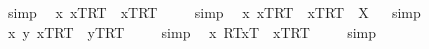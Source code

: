 \begin{isabellebody}
\isamarkupfalse%
\ simp\ \isamarkupfalse%
%
\endisatagproof
{\isafoldproof}%
%
\isadelimproof
%
\endisadelimproof
\isanewline
\isanewline
{}\isamarkupfalse%
\ {\isachardoublequoteopen}{\isacharbrackleft}{\isacharparenleft}\isactrlbold {\isasymforall}x{\isachardot}\ {\isasymlbrace}x\isactrlsup T{\isacharcomma}R\isactrlsup T{\isasymrbrace}\ \isactrlbold {\isasymrightarrow}\ {\isasymlbrace}x\isactrlsup T{\isacharcomma}R\isactrlsup T{\isasymrbrace}{\isacharparenright}{\isacharbrackright}\ {\isacharequal}\ {\isasymtop}{\isachardoublequoteclose}%
\isadelimproof
\ %
\endisadelimproof
%
\isatagproof
{}\isamarkupfalse%
\ simp\ \isamarkupfalse%
%
\endisatagproof
{\isafoldproof}%
%
\isadelimproof
%
\endisadelimproof
\isanewline
{}\isamarkupfalse%
\ {\isachardoublequoteopen}{\isacharparenleft}\isactrlbold {\isasymforall}x{\isachardot}\ {\isasymlbrace}x\isactrlsup T{\isacharcomma}R\isactrlsup T{\isasymrbrace}\ \isactrlbold {\isasymrightarrow}\ {\isasymlbrace}x\isactrlsup T{\isacharcomma}R\isactrlsup T{\isasymrbrace}{\isacharparenright}\ {\isacharequal}\ X{\isachardoublequoteclose}%
\isadelimproof
\ %
\endisadelimproof
%
\isatagproof
{}\isamarkupfalse%
\ simp\ \isamarkupfalse%
%
\endisatagproof
{\isafoldproof}%
%
\isadelimproof
%
\endisadelimproof
\isanewline
\isanewline
{}\isamarkupfalse%
\ {\isachardoublequoteopen}{\isacharbrackleft}{\isacharparenleft}\isactrlbold {\isasymexists}x\ y{\isachardot}\ {\isasymlbrace}x\isactrlsup T{\isacharcomma}R\isactrlsup T{\isasymrbrace}\ \isactrlbold {\isasymrightarrow}\ {\isasymlbrace}y\isactrlsup T{\isacharcomma}R\isactrlsup T{\isasymrbrace}{\isacharparenright}{\isacharbrackright}\ {\isacharequal}\ {\isasymtop}{\isachardoublequoteclose}%
\isadelimproof
\ %
\endisadelimproof
%
\isatagproof
{}\isamarkupfalse%
\ simp\ \isamarkupfalse%
%
\endisatagproof
{\isafoldproof}%
%
\isadelimproof
%
\endisadelimproof
\isanewline
\isanewline
{}\isamarkupfalse%
\ {\isachardoublequoteopen}{\isacharbrackleft}{\isacharparenleft}\isactrlbold {\isasymforall}x{\isachardot}\ {\isasymlparr}R\isactrlsup T{\isacharcomma}x\isactrlsup T{\isasymrparr}\ \isactrlbold {\isasymrightarrow}\ {\isasymlbrace}x\isactrlsup T{\isacharcomma}R\isactrlsup T{\isasymrbrace}{\isacharparenright}{\isacharbrackright}\ {\isacharequal}\ {\isacharasterisk}{\isachardoublequoteclose}%
\isadelimproof
\ %
\endisadelimproof
%
\isatagproof
{}\isamarkupfalse%
\ simp\ \isamarkupfalse%

\end{isabellebody}

